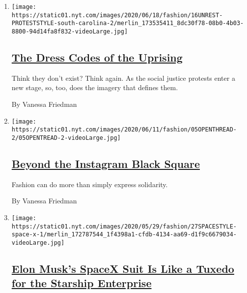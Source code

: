 \begin{enumerate}
\def\labelenumi{\arabic{enumi}.}
\item
  \texttt{[image: https://static01.nyt.com/images/2020/06/18/fashion/16UNREST-PROTESTSTYLE-south-carolina-2/merlin\_173535411\_8dc30f78-08b0-4b03-8800-94d14fa8f832-videoLarge.jpg]}

  \hypertarget{the-dress-codes-of-the-uprising}{%
  \subsection{\texorpdfstring{\href{/2020/06/16/fashion/the-dress-codes-of-the-uprising.html}{The
  Dress Codes of the
  Uprising}}{The Dress Codes of the Uprising}}\label{the-dress-codes-of-the-uprising}}

  Think they don't exist? Think again. As the social justice protests
  enter a new stage, so, too, does the imagery that defines them.

  By Vanessa Friedman
\item
  \texttt{[image: https://static01.nyt.com/images/2020/06/11/fashion/05OPENTHREAD-2/05OPENTREAD-2-videoLarge.jpg]}

  \hypertarget{beyond-the-instagram-black-square}{%
  \subsection{\texorpdfstring{\href{/2020/06/06/style/fashion-racism-actions.html}{Beyond
  the Instagram Black
  Square}}{Beyond the Instagram Black Square}}\label{beyond-the-instagram-black-square}}

  Fashion can do more than simply express solidarity.

  By Vanessa Friedman
\item
  \texttt{[image: https://static01.nyt.com/images/2020/05/29/fashion/27SPACESTYLE-space-x-1/merlin\_172787544\_1f4398a1-cfdb-4134-aa69-d1f9c6679034-videoLarge.jpg]}

  \hypertarget{elon-musks-spacex-suit-is-like-a-tuxedo-for-the-starship-enterprise}{%
  \subsection{\texorpdfstring{\href{/2020/05/27/fashion/SpaceX-Dragon-Suits.html}{Elon
  Musk's SpaceX Suit Is Like a Tuxedo for the Starship
  Enterprise}}{Elon Musk's SpaceX Suit Is Like a Tuxedo for the Starship Enterprise}}\label{elon-musks-spacex-suit-is-like-a-tuxedo-for-the-starship-enterprise}}


\end{enumerate}
